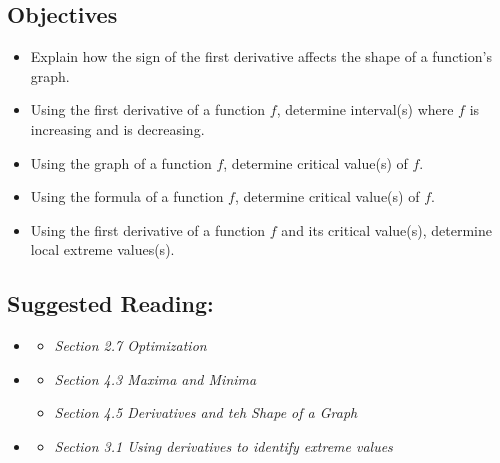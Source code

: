 \vspace{-0.25 in}
\begin{framed}
\subsection*{Objectives}
\begin{itemize}
    \item Explain how the sign of the first derivative affects the shape of a function’s graph.
    \item Using the first derivative of a function $f$, determine interval(s) where $f$ is increasing and is decreasing.
    \item Using the graph of a function $f$, determine critical value(s) of $f$.
    \item Using the formula of a function $f$, determine critical value(s) of $f$.
    \item Using the first derivative of a function $f$ and its critical value(s), determine local extreme values(s).
\end{itemize}

\subsection*{Suggested Reading:}
\begin{itemize}
\item \cite{Calaway}\footnotemark[1]
   \begin{itemize}
        \item \emph{Section 2.7 Optimization}
    \end{itemize}
\item \cite{openstax}\footnotemark[2]
    \begin{itemize}
        \item \emph{Section 4.3  Maxima and Minima}
        \item \emph{Section 4.5 Derivatives and teh Shape of a Graph}
    \end{itemize}
\item \cite{activeCalc}\footnotemark[3]
    \begin{itemize}
        \item \emph{Section 3.1 Using derivatives to identify extreme values}
    \end{itemize}
\end{itemize}

\end{framed}
